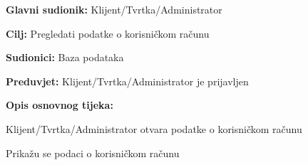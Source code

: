 \noindent {}
\begin{packed_item}
	
	\item \textbf{Glavni sudionik:} Klijent/Tvrtka/Administrator
	\item \textbf{Cilj:} Pregledati podatke o korisničkom računu
	\item \textbf{Sudionici:} Baza podataka
	\item \textbf{Preduvjet:} Klijent/Tvrtka/Administrator je prijavljen
	\item \textbf{Opis osnovnog tijeka:}
	
	\item[] \begin{packed_enum}
		
		\item Klijent/Tvrtka/Administrator otvara podatke o korisničkom računu
		\item Prikažu se podaci o korisničkom računu
	
	\end{packed_enum}
	
\end{packed_item}


